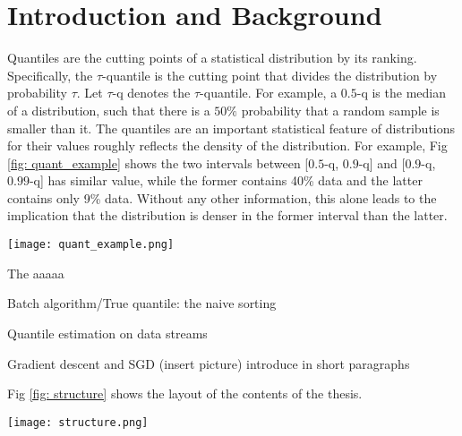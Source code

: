 \chapter{Introduction and Background}
\label{ch: intro}

\graphicspath{{Figures/Intro/}{./}} 

Quantiles are the cutting points of a statistical distribution by its ranking. Specifically, the $\tau$-quantile is the cutting point that divides the distribution by probability $\tau$. Let $\tau$-q denotes the $\tau$-quantile. For example, a $0.5$-q is the median of a distribution, such that there is a $50\%$ probability that a random sample is smaller than it.
The quantiles are an important statistical feature of distributions for their values roughly reflects the density of the distribution.
For example, Fig \ref{fig: quant_example} shows the two intervals between [$0.5$-q, $0.9$-q] and [$0.9$-q, $0.99$-q] has similar value, while the former contains 40\% data and the latter contains only 9\% data. Without any other information, this alone leads to the implication that the distribution is denser in the former interval than the latter.

\begin{figure*}[h!]
    \centering
	\texttt{[image: quant\_example.png]}
    \caption{Quantiles (0.5-q, 0.9-q and 0.99-q) of a dataset containing 2000 random samples from a Gaussian distribution (mean = 2, standard deviation = 18)}
    \label{fig: quant_example}
\end{figure*}

The aaaaa

Batch algorithm/True quantile: the naive sorting

Quantile estimation on data streams

Gradient descent and SGD (insert picture) introduce in short paragraphs

Fig \ref{fig: structure} shows the layout of the contents of the thesis.

\begin{figure*}[h!]
    \centering
	\texttt{[image: structure.png]}
    \caption{The relationship between topics covered in the thesis}
    \label{fig: structure}
\end{figure*}